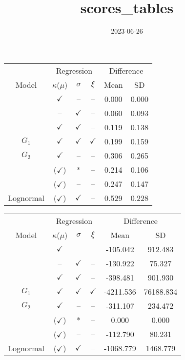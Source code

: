 \documentclass[
]{article}
\title{scores\_tables}
\author{}
\date{\vspace{-2.5em}2023-06-26}
\begin{document}
\maketitle

\begin{tabular}{cccccc}
\toprule
\multicolumn{1}{c}{ } & \multicolumn{3}{c}{Regression} & \multicolumn{2}{c}{Difference} \\
\cmidrule(l{3pt}r{3pt}){2-4} \cmidrule(l{3pt}r{3pt}){5-6}
Model & $\kappa$($\mu$) & $\sigma$ & $\xi$ & Mean & SD\\
\midrule
 & $\checkmark$ & -- & -- & 0.000 & 0.000\\

 & -- & $\checkmark$ & -- & 0.060 & 0.093\\

 & $\checkmark$ & $\checkmark$ & -- & 0.119 & 0.138\\

\multirow{-4}{*}{\centering\arraybackslash $G_1$} & $\checkmark$ & $\checkmark$ & $\checkmark$ & 0.199 & 0.159\\
\cmidrule{1-6}
$G_2$ & $\checkmark$ & -- & -- & 0.306 & 0.265\\
\cmidrule{1-6}
 & ($\checkmark$) & * & -- & 0.214 & 0.106\\

 & ($\checkmark$) & -- & -- & 0.247 & 0.147\\

\multirow{-3}{*}{\centering\arraybackslash Lognormal} & ($\checkmark$) & $\checkmark$ & -- & 0.529 & 0.228\\
\bottomrule
\end{tabular}

\begin{tabular}{cccccc}
\toprule
\multicolumn{1}{c}{ } & \multicolumn{3}{c}{Regression} & \multicolumn{2}{c}{Difference} \\
\cmidrule(l{3pt}r{3pt}){2-4} \cmidrule(l{3pt}r{3pt}){5-6}
Model & $\kappa$($\mu$) & $\sigma$ & $\xi$ & Mean & SD\\
\midrule
 & $\checkmark$ & -- & -- & -105.042 & 912.483\\

 & -- & $\checkmark$ & -- & -130.922 & 75.327\\

 & $\checkmark$ & $\checkmark$ & -- & -398.481 & 901.930\\

\multirow{-4}{*}{\centering\arraybackslash $G_1$} & $\checkmark$ & $\checkmark$ & $\checkmark$ & -4211.536 & 76188.834\\
\cmidrule{1-6}
$G_2$ & $\checkmark$ & -- & -- & -311.107 & 234.472\\
\cmidrule{1-6}
 & ($\checkmark$) & * & -- & 0.000 & 0.000\\

 & ($\checkmark$) & -- & -- & -112.790 & 80.231\\

\multirow{-3}{*}{\centering\arraybackslash Lognormal} & ($\checkmark$) & $\checkmark$ & -- & -1068.779 & 1468.779\\
\bottomrule
\end{tabular}
\end{document}
